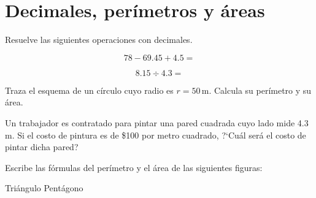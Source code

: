 \documentclass[11pt]{article}
\begin{document}
\section{Decimales, per\'imetros y \'areas }

Resuelve las siguientes operaciones con decimales.

\begin{multicols}{2}

\begin{equation*}
    78 - 69.45 + 4.5 =
\end{equation*}

\begin{equation*}
    8.15 \div 4.3  =
\end{equation*}

\end{multicols}

\vspace{3cm}

Traza el esquema de un c\'irculo cuyo radio es $r=50$\,m. Calcula su per\'imetro y su \'area.


Un trabajador es contratado para pintar una pared cuadrada cuyo lado mide 4.3\,m. Si el costo de pintura es de \$100 por metro cuadrado, ?`Cu\'al ser\'a el costo de pintar dicha pared?

\vspace{6cm}

Escribe las f\'ormulas del per\'imetro y el \'area de las siguientes figuras:

\vspace{1cm}

\hfill Tri\'angulo \hfill \hfill Pent\'agono \hfill \
\end{document}
